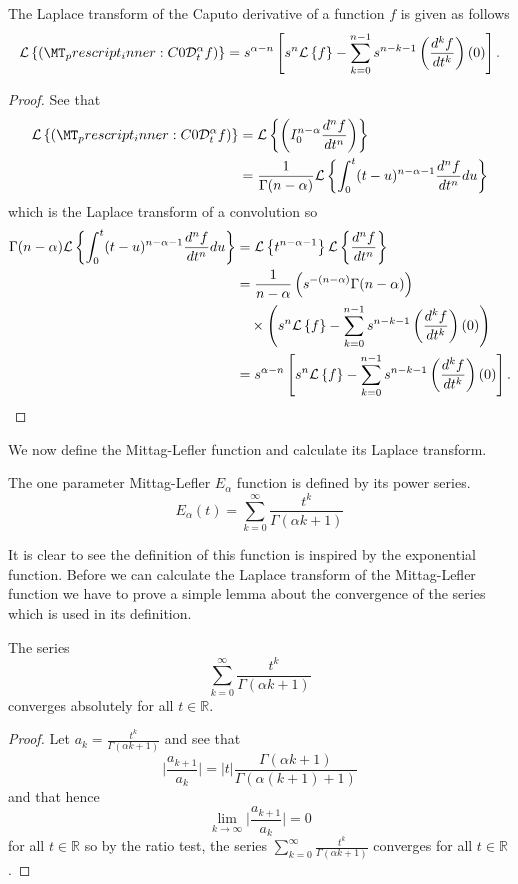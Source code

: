 \begin{lemma}
\label{lem:lap_cap}
	The Laplace transform of the Caputo derivative of  a function $ f $ is given as follows
	\begin{align*}
		\laplace{\capder{0}{t}{\alpha}{f}} = s^{\alpha - n} \left[ s^n \laplace{f} - \sum_{k=0}^{n-1} s^{n-k-1} \left( \der{f}{t}{k} \right)(0) \right].
	\end{align*}
\end{lemma}
\begin{proof}
	See that
	\begin{align*}
		\laplace{\capder{0}{t}{\alpha}{f}} &= \laplace{  \rli{0}{n-\alpha}{\der{f}{t}{n}}} \\
			&= \frac{1}{\Gamma(n-\alpha)}\laplace{ \int_0^t (t-u)^{n-\alpha-1} \der{f}{t}{n} du} \\ 
	\end{align*}
	which is the Laplace transform of a convolution so
	\begin{align*}
		\Gamma(n-\alpha)\mathcal{L} \left\{  \int_0^t (t-u)^{n-\alpha-1} \frac{d^{n}f}{dt^{n}} du \right\} &= \mathcal{L} \left\{ t^{n-\alpha-1} \right\} \mathcal{L} \left\{ \frac{d^{n}f}{dt^{n}} \right\} \\
		&= \frac{1}{n-\alpha} \left( s^{-(n-\alpha)} \Gamma(n-\alpha) \right) \\
		& \ \ \ \times \left( s^n \mathcal{L} \left\{ f \right\} - \sum_{k=0}^{n-1} s^{n-k-1} \left( \frac{d^{k}f}{dt^{k}} \right)(0) \right) \\
		&= s^{\alpha - n} \left[ s^n \mathcal{L} \left\{ f \right\} - \sum_{k=0}^{n-1} s^{n-k-1} \left( \frac{d^{k}f}{dt^{k}} \right)(0) \right].
	\end{align*}	
\end{proof}

We now define the Mittag-Lefler function and calculate its Laplace transform.

\begin{definition}
	The one parameter Mittag-Lefler $ E_\alpha $ function is defined by its power series.
	$$
		E_\alpha(t) = \sum_{k=0}^{\infty} \frac{t^k}{\Gamma(\alpha k + 1)}
	$$
\end{definition}
It is clear to see the definition of this function is inspired by the exponential function. Before we can calculate the 
Laplace transform of the Mittag-Lefler function we have to prove a simple lemma about the convergence of the 
series which is used in its definition.

\begin{lemma}
\label{lem:mit_conv}

	The series
	$$
		\sum_{k=0}^{\infty} \frac{t^k}{\Gamma(\alpha k + 1)} 
	$$
  	converges absolutely for all $ t \in \mathbb{R} $.
\end{lemma}
\begin{proof}
	Let $ a_k = \frac{t^k}{\Gamma(\alpha k + 1) }$ and see that
	$$ \lvert \frac{a_{k+1}}{a_k} \rvert = |t| \frac{\Gamma(\alpha k + 1) }{\Gamma(\alpha(k+1) + 1)} $$
	and that hence 
	$$
		\lim_{k \longrightarrow \infty} \lvert \frac{a_{k+1}}{a_k} \rvert = 0
	$$
	for all $ t \in \mathbb{R} $ so by the ratio test, the series $ \sum_{k=0}^{\infty} \frac{t^k}{\Gamma(\alpha k + 1)}  $
	converges for all $ t \in \mathbb{R} $.
\end{proof}

